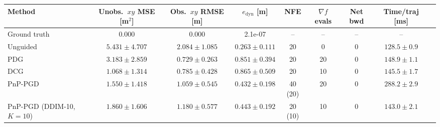 \begin{tabular}{lcccccccc}
\toprule
Method & Unobs.\ $xy$ MSE [m$^2$] & Obs.\ $xy$ RMSE [m] & $e_{\mathrm{dyn}}$ [m] & NFE & $\nabla f$ evals & Net bwd & Time/traj [ms] \\
\midrule
Ground truth & 0.000 & 0.000 & 2.1e-07 & -- & -- & -- & -- \\
Unguided & $5.431 \pm 4.707$ & $2.084 \pm 1.085$ & $0.263 \pm 0.111$ & 20 & 0 & 0 & $128.5 \pm 0.9$ \\
PDG & $3.183 \pm 2.859$ & $0.729 \pm 0.263$ & $0.851 \pm 0.394$ & 20 & 20 & 0 & $148.9 \pm 1.1$ \\
DCG & $1.068 \pm 1.314$ & $0.785 \pm 0.428$ & $0.865 \pm 0.509$ & 20 & 10 & 0 & $145.5 \pm 1.7$ \\
PnP-PGD & $1.550 \pm 1.418$ & $1.059 \pm 0.545$ & $0.432 \pm 0.198$ & 40 (20) & 20 & 0 & $288.2 \pm 2.9$ \\
PnP-PGD (DDIM-10, $K{=}10$) & $1.860 \pm 1.606$ & $1.180 \pm 0.577$ & $0.443 \pm 0.192$ & 20 (10) & 10 & 0 & $143.0 \pm 2.1$ \\
\bottomrule
\end{tabular}

